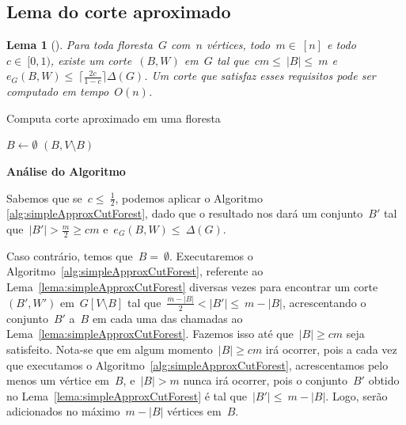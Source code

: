 \documentclass[a4paper,12pt]{article}
\newtheorem{lem}{Lema}
\begin{document}
\subsection{Lema do corte aproximado}

\begin{lem}[{\cite[Lemma 3]{Schmidt15}}]
\label{lema:approxCutForest}
	Para toda floresta~$G$ com~$n$ vértices, todo~$m \in~[n]$
	e todo~$c \in~[0,1)$,
	existe um corte~$(B,W)$ em~$G$ tal 
	que~$cm \le~|B| \le~m$ 
	e~$e_G(B,W) \le~\lceil \frac{2c}{1-c}\rceil \Delta(G)$.
	Um corte que satisfaz esses requisitos pode ser computado em
	tempo~$O(n)$.
\end{lem}

\medskip
\medskip

\begin{algorithm}[H]
\label{alg:approxCutForest}

	\caption{Computa corte aproximado em uma floresta}
	{
		$B \gets \emptyset$\;
	}
	\Return $(B,V\setminus B)$

\end{algorithm}	

\bigskip
\bigskip
\bigskip

\textbf{Análise do Algoritmo}

	Sabemos que se~$c \le~\frac{1}{2}$, podemos aplicar o Algoritmo 
	\ref{alg:simpleApproxCutForest}, 
	dado que o resultado nos dará um conjunto~$B'$ tal 
	que~$|B'|>\frac{m}{2}\ge cm$ e~$e_G(B,W)\le~\Delta(G)$.

	Caso contrário, temos que~$B =~\emptyset$.
	Executaremos o 
	Algoritmo~\ref{alg:simpleApproxCutForest}, referente ao 
	Lema~\ref{lema:simpleApproxCutForest}
	diversas vezes para 
	encontrar 
	um corte~$(B',W')$ em~$G[V\setminus B]$ tal 
	que~$\frac{m-|B|}{2}<|B'|\le~m-|B|$,
	acrescentando o conjunto~$B'$ a~$B$ em cada uma das chamadas ao 
	Lema~\ref{lema:simpleApproxCutForest}.
	Fazemos isso até que~$|B|\ge cm$ seja satisfeito.
	Nota-se que em algum momento~$|B|\ge cm$ irá ocorrer, pois a cada vez
	que executamos o 
	Algoritmo~\ref{alg:simpleApproxCutForest}, 
	acrescentamos pelo menos um vértice em~$B$,
	e~$|B|>m$ nunca irá ocorrer, pois o conjunto~$B'$ obtido no 
	Lema~\ref{lema:simpleApproxCutForest} é
	tal que~$|B'|\le~m-|B|$. Logo, serão adicionados no 
	máximo~$m-|B|$ vértices em~$B$.
\end{document}
